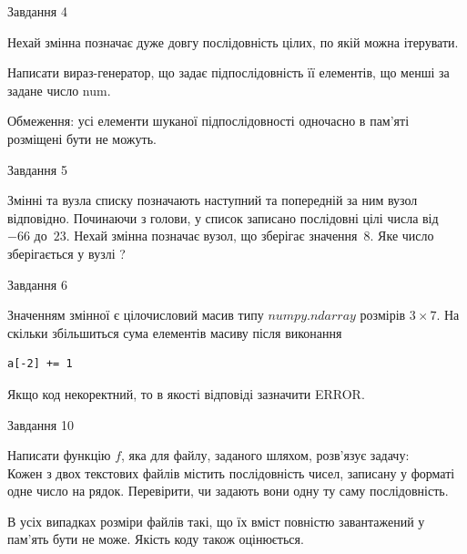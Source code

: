 \documentclass[12pt, ukrainian]{article}
\begin{document}
{               
{\begin{center}Завдання {4}\end{center}}
\vspace{-6mm}
Нехай змінна  позначає дуже довгу послідовність цілих, по якій можна ітерувати.

Написати вираз-генератор, що задає підпослідовність її елементів, що менші за задане число num.

Обмеження: усі елементи шуканої підпослідовності одночасно в пам'яті розміщені бути не можуть.\par

\vspace{10mm}
               
{\begin{center}Завдання {5}\end{center}}
\vspace{-6mm}
Змінні  та  вузла списку позначають наступний та попередній за ним вузол відповідно. Починаючи з голови, у список записано послідовні цілі числа від~$-66$ до~$23$. Нехай змінна  позначає вузол, що зберігає значення~$8$.
Яке число зберігається у вузлі  ?\par

               
{\begin{center}Завдання {6}\end{center}}
\vspace{-6mm}
Значенням змінної  є цілочисловий масив типу $numpy.ndarray$ розмірів $3{\times}7$. На скільки збільшиться сума елементів масиву  після виконання
\begin{verbatim}
a[-2] += 1
\end{verbatim}


Якщо код некоректний, то в якості відповіді зазначити ERROR.\par

               
{\begin{center}Завдання {10}\end{center}}
\vspace{-6mm}

Написати функцію $f$, яка для файлу, заданого шляхом, розв’язує задачу:\\ Кожен з двох текстових файлів містить послідовність чисел, записану у форматі одне число на рядок.  Перевірити, чи задають вони одну ту саму послідовність.

В усіх випадках розміри файлів такі, що їх вміст повністю завантажений у пам'ять бути не може. Якість коду також оцінюється.



}
\end{document}
